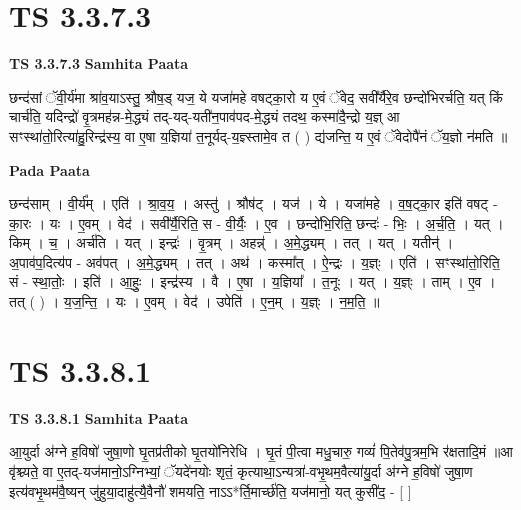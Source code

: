 \documentclass[17pt]{extarticle}
\begin{document}
\section*{ TS 3.3.7.3 }

\textbf{TS 3.3.7.3 } \newline
\textbf{Samhita Paata} \newline

छन्द॑सां ॅवी॒र्य॑मा श्रा॑व॒याऽस्तु॒ श्रौष॒ड् यज॒ ये यजा॑महे वषट्का॒रो य ए॒वं ॅवेद॒ सवी᳚र्यैरे॒व छन्दो॑भिरर्चति॒ यत् किं चार्च॑ति॒ यदिन्द्रो॑ वृ॒त्रमह॑न्न-मे॒द्ध्यं तद्-यद्-यती॑न॒पाव॑पद-मे॒द्ध्यं तदथ॒ कस्मा॑दै॒न्द्रो य॒ज्ञ् आ सꣳस्था॑तो॒रित्या॑हु॒रिन्द्र॑स्य॒ वा ए॒षा य॒ज्ञिया॑ त॒नूर्यद्-य॒ज्ञ्स्तामे॒व त ( ) द्य॑जन्ति॒ य ए॒वं ॅवेदोपै॑नं ॅय॒ज्ञो न॑मति ॥ \newline

\textbf{Pada Paata} \newline

छन्द॑साम् । वी॒र्य᳚म् । एति॑ । श्रा॒व॒य॒ । अस्तु॑ । श्रौष॑ट् । यज॑ । ये । यजा॑महे । व॒ष॒ट्का॒र इति॑ वषट् - का॒रः । यः । ए॒वम् । वेद॑ । सवी᳚र्यै॒रिति॒ स - वी॒र्यैः॒ । ए॒व । छन्दो॑भि॒रिति॒ छन्दः॑ - भिः॒ । अ॒र्च॒ति॒ । यत् । किम् । च॒ । अर्च॑ति । यत् । इन्द्रः॑ । वृ॒त्रम् । अहन्न्॑ । अ॒मे॒द्ध्यम् । तत् । यत् । यतीन्॑ । अ॒पाव॑प॒दित्य॑प - अव॑पत् । अ॒मे॒द्ध्यम् । तत् । अथ॑ । कस्मा᳚त् । ऐ॒न्द्रः । य॒ज्ञ्ः । एति॑ । सꣳस्था॑तो॒रिति॒ सं - स्था॒तोः॒ । इति॑ । आ॒हुः॒ । इन्द्र॑स्य । वै । ए॒षा । य॒ज्ञिया᳚ । त॒नूः । यत् । य॒ज्ञ्ः । ताम् । ए॒व । तत् ( ) । य॒ज॒न्ति॒ । यः । ए॒वम् । वेद॑ । उपेति॑ । ए॒न॒म् । य॒ज्ञ्ः । न॒म॒ति॒ ॥  \newline




\section*{ TS 3.3.8.1 }

\textbf{TS 3.3.8.1 } \newline
\textbf{Samhita Paata} \newline

आ॒युर्दा अ॑ग्ने ह॒विषो॑ जुषा॒णो घृ॒तप्र॑तीको घृ॒तयो॑निरेधि । घृ॒तं पी॒त्वा मधु॒चारु॒ गव्यं॑ पि॒तेव॑पु॒त्रम॒भि र॑क्षतादि॒मं ॥आ वृ॑श्च्यते॒ वा ए॒तद्-यज॑मानो॒ऽग्निभ्यां॒ ॅयदे॑नयोः शृतं॒ कृत्याथा॒ऽन्यत्रा॑-वभृ॒थम॒वैत्या॑यु॒र्दा अ॑ग्ने ह॒विषो॑ जुषा॒ण इत्य॑वभृ॒थम॑वै॒ष्यन् जु॑हुया॒दाहु॑त्यै॒वैनौ॑ शमयति॒ नाऽऽ*र्ति॒मार्च्छ॑ति॒ यज॑मानो॒ यत् कुसी॑द॒ - [  ] \newline
\end{document}
